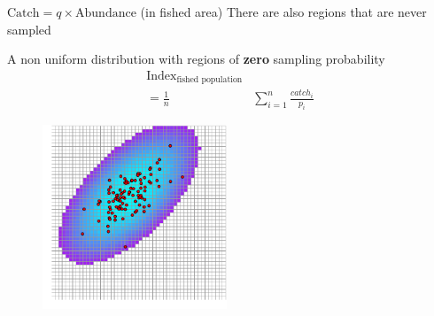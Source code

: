 \documentclass{beamer}
\begin{document}
\begin{frame}{$\text{Catch} = q \times \text{Abundance}$ (in \alert{fished} area)}
There are also regions that are never sampled\\
\begin{minipage}{0.4\textwidth}
  \begin{flushright}
    A non uniform distribution with regions of \alert{\textbf{zero}} sampling probability \\
    \begin{align*}
      \text{Index}_\text{fished population} & \\
       = \frac{1}{n} &\sum_{i=1}^n \frac{catch_i}{p_i}  
    \end{align*}  
  \end{flushright}
\end{minipage}
\hspace{0.5cm}
\begin{minipage}{0.4\textwidth}
  \begin{figure}
    \centering
    \includegraphics[width=5.5cm]{fig4}
  \end{figure}
\end{minipage}
\end{frame}
\end{document}
